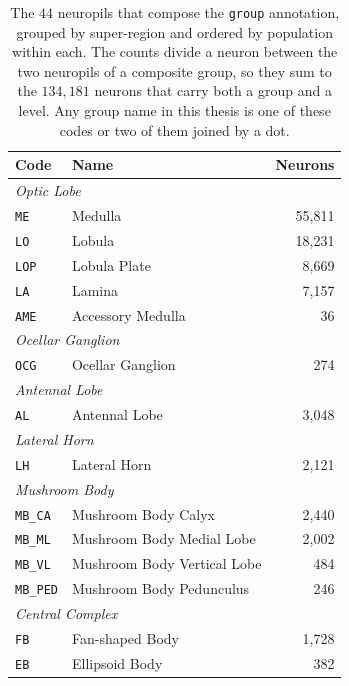 \documentclass[12pt,a4paper,oneside]{article}
\theoremstyle{definition}
\theoremstyle{plain}
\newcommand{\code}[1]{\texttt{#1}}
\begin{document}
\begin{table}[t]
\centering
\caption[The 44 neuropils of the annotation]{The $44$ neuropils that compose
the \code{group} annotation, grouped by super-region and ordered by
population within each. The counts divide a neuron between the two neuropils
of a composite group, so they sum to the $134{,}181$ neurons that carry both
a group and a level. Any group name in this thesis is one of these codes or
two of them joined by a dot.}
\label{tab:neuropils}
\scriptsize
\begin{minipage}[t]{0.49\textwidth}
\vspace{0pt}
\centering
\begin{tabular}{llr}
\toprule
Code & Name & Neurons \\
\midrule
\multicolumn{3}{l}{\textit{Optic Lobe}} \\
\code{ME} & Medulla & 55{,}811 \\
\code{LO} & Lobula & 18{,}231 \\
\code{LOP} & Lobula Plate & 8{,}669 \\
\code{LA} & Lamina & 7{,}157 \\
\code{AME} & Accessory Medulla & 36 \\
\midrule
\multicolumn{3}{l}{\textit{Ocellar Ganglion}} \\
\code{OCG} & Ocellar Ganglion & 274 \\
\midrule
\multicolumn{3}{l}{\textit{Antennal Lobe}} \\
\code{AL} & Antennal Lobe & 3{,}048 \\
\midrule
\multicolumn{3}{l}{\textit{Lateral Horn}} \\
\code{LH} & Lateral Horn & 2{,}121 \\
\midrule
\multicolumn{3}{l}{\textit{Mushroom Body}} \\
\code{MB\_CA} & Mushroom Body Calyx & 2{,}440 \\
\code{MB\_ML} & Mushroom Body Medial Lobe & 2{,}002 \\
\code{MB\_VL} & Mushroom Body Vertical Lobe & 484 \\
\code{MB\_PED} & Mushroom Body Pedunculus & 246 \\
\midrule
\multicolumn{3}{l}{\textit{Central Complex}} \\
\code{FB} & Fan-shaped Body & 1{,}728 \\
\code{EB} & Ellipsoid Body & 382 \\

\end{tabular}
\end{minipage}
\end{table}
\end{document}
